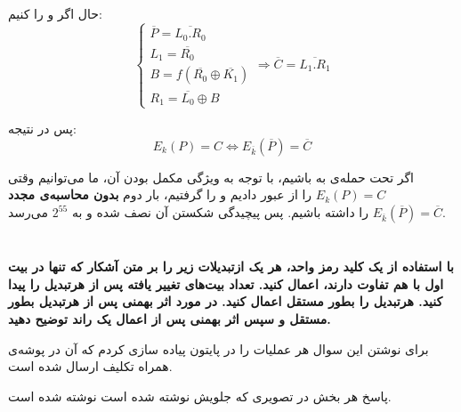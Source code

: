 \documentclass[dvipsnames, svgnames, x11names]{article}
\begin{document}
\begin{enumerate}[label=\alph*)]
حال اگر 
و 
را 
کنیم:
\begin{equation}
\begin{cases}
\overline{P} = \overline{L_0.R_0}\\
L_1 = \overline{R_0} \\
B = f(\overline{R_0} \oplus \overline{K_1}) \\
R_1 = \overline{L_0} \oplus B
\end{cases}
\Rightarrow \overline{C} = \overline{L_1.R_1}
\end{equation}

پس در نتیجه:
\begin{equation}
E_k(P) = C \iff E_{\overline{k}}(\overline{P}) = \overline{C}
\end{equation}

اگر تحت حمله‌ی 
به 
باشیم، با توجه به ویژگی مکمل بودن آن، ما می‌توانیم وقتی 
$E_k(P) = C$
را از 
عبور دادیم و 
را گرفتیم، بار دوم \textbf{بدون محاسبه‌ی مجدد}
$E_{\overline{k}}(\overline{P}) = \overline{C}$
را داشته باشیم. پس پیچیدگی شکستن آن نصف شده و به 
$2^{55}$
می‌رسد.

\end{enumerate}

\section{}
{\large \textbf{با استفاده از یک کلید رمز واحد، هر یک ازتبدیلات زیر را بر متن آشکار که تنها در بیت اول با هم تفاوت دارند، اعمال کنید. تعداد بیت‌های تغییر یافته پس از هرتبدیل را پیدا کنید. هرتبدیل را بطور مستقل اعمال کنید. در مورد اثر بهمنی پس از هرتبدیل بطور مستقل و سپس اثر بهمنی پس از اعمال یک راند توضیح دهید.}}

برای نوشتن این سوال هر عملیات 
را در پایتون پیاده سازی کردم که 
آن در پوشه‌ی 
همراه تکلیف ارسال شده است.

پاسخ هر بخش در تصویری که جلویش نوشته شده‌ است نوشته شده است.
\end{document}
